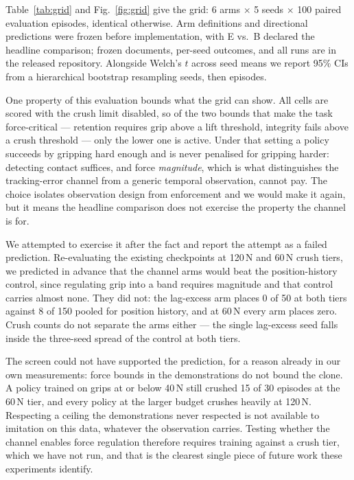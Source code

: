 \documentclass{article}
\begin{document}
Table~\ref{tab:grid} and Fig.~\ref{fig:grid} give the grid: 6 arms
$\times$ 5 seeds $\times$ 100 paired evaluation episodes, identical
otherwise. Arm definitions and directional predictions were frozen before
implementation, with E vs.\ B declared the headline comparison; frozen
documents, per-seed outcomes, and all runs are in the released
repository. Alongside Welch's $t$ across seed means we report 95\% CIs
from a hierarchical bootstrap resampling seeds, then episodes.

One property of this evaluation bounds what the grid can show. All cells
are scored with the crush limit disabled, so of the two bounds that make
the task force-critical --- retention requires grip above a lift
threshold, integrity fails above a crush threshold --- only the lower one
is active. Under that setting a policy succeeds by gripping hard enough
and is never penalised for gripping harder: detecting contact suffices,
and force \emph{magnitude}, which is what distinguishes the tracking-error
channel from a generic temporal observation, cannot pay. The choice
isolates observation design from enforcement and we would make it again,
but it means the headline comparison does not exercise the property the
channel is for.

We attempted to exercise it after the fact and report the attempt as a
failed prediction. Re-evaluating the existing checkpoints at 120\,N and
60\,N crush tiers, we predicted in advance that the channel arms would
beat the position-history control, since regulating grip into a band
requires magnitude and that control carries almost none. They did not:
the lag-excess arm places 0 of 50 at both tiers against 8 of 150 pooled
for position history, and at 60\,N every arm places zero. Crush counts do
not separate the arms either --- the single lag-excess seed falls inside
the three-seed spread of the control at both tiers.

The screen could not have supported the prediction, for a reason already
in our own measurements: force bounds in the demonstrations do not bound
the clone. A policy trained on grips at or below 40\,N still crushed 15
of 30 episodes at the 60\,N tier, and every policy at the larger budget
crushes heavily at 120\,N. Respecting a ceiling the demonstrations never
respected is not available to imitation on this data, whatever the
observation carries. Testing whether the channel enables force regulation
therefore requires training against a crush tier, which we have not run,
and that is the clearest single piece of future work these experiments
identify.
\end{document}
